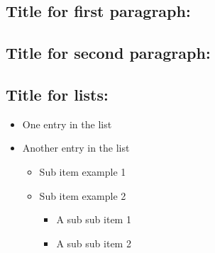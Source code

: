 \documentclass[12pt]{article} %
\begin{document}
\begin{flushleft}
\section*{Title for first paragraph:}
\lipsum[1]
\end{flushleft}


\begin{flushleft}
\section*{Title for second paragraph:}
\lipsum[1]
\end{flushleft}


\newpage


\begin{flushleft}
\section*{Title for lists:}
\begin{itemize}
  \item One entry in the list
  \item Another entry in the list
  \begin{itemize}
  \item Sub item example 1
  \item Sub item example 2
  \begin{itemize}
  \item A sub sub item 1
  \item A sub sub item 2
  \end{itemize}
  \end{itemize}
\end{itemize}
\end{flushleft}


\newpage
\end{document}

